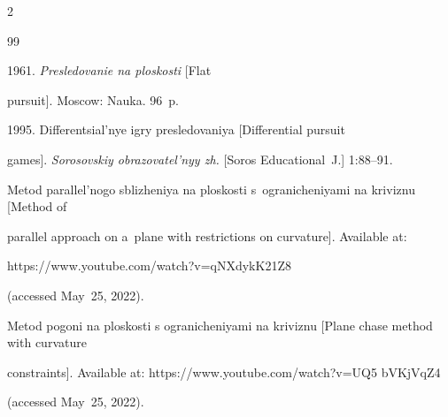   \begin{multicols}{2}





\renewcommand{\bibname}{\protect\rmfamily References}







{\small\frenchspacing


 { %




 \begin{thebibliography}{99}


 


 \vspace*{-2pt}







 1961. \textit{Presledovanie na ploskosti} [Flat 


pursuit]. Moscow: Nauka. 96~p.







 1995. Differentsial'nye igry presledovaniya [Differential pursuit 


games]. \textit{Sorosovskiy obrazovatel'nyy zh.} [Soros Educational~J.] 1:88--91.







Metod parallel'nogo sblizheniya na ploskosti s~og\-ra\-ni\-che\-ni\-yami na kriviznu [Method of 


parallel approach on a~plane with restrictions on curvature]. Available at: {\sf 


https://www.youtube.com/watch?v=qNXdykK21Z8} (accessed May~25, 2022).




Metod pogoni na ploskosti s ogranicheniyami na kriviznu [Plane chase method with curvature 


constraints]. Available  at:  {\sf https://www.youtube.com/watch?v=UQ5 bVKjVqZ4} 


(accessed May~25, 2022).



\end{thebibliography}}}
\end{multicols}
